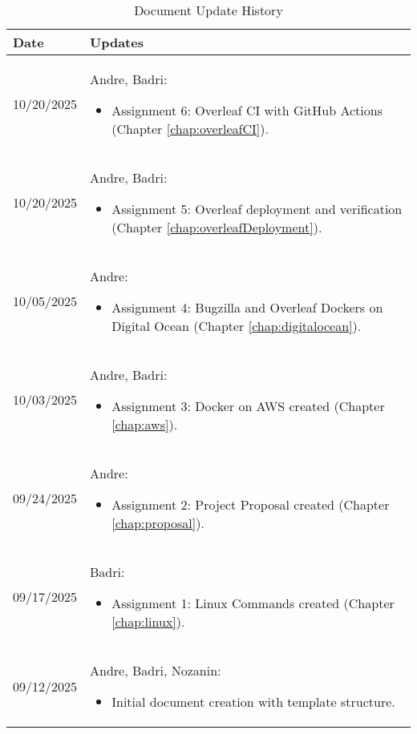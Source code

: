 \begin{longtable}{|l||p{13.5cm}|}
\caption{Document Update History \label{Table::UpdateHistory}}\\
\hline
\textbf{Date} & \textbf{Updates} \\
\hline 
\endhead
10/20/2025 & Andre, Badri:
\begin{itemize}[topsep=0pt,itemsep=0pt,parsep=0pt,partopsep=0pt,leftmargin=12pt]
\item Assignment 6: Overleaf CI with GitHub Actions (Chapter \ref{chap:overleafCI}).
\end{itemize}
\\ \hline
10/20/2025 & Andre, Badri:
\begin{itemize}[topsep=0pt,itemsep=0pt,parsep=0pt,partopsep=0pt,leftmargin=12pt]
\item Assignment 5: Overleaf deployment and verification (Chapter \ref{chap:overleafDeployment}).
\end{itemize}
\\ \hline
10/05/2025 & Andre:
\begin{itemize}[topsep=0pt,itemsep=0pt,parsep=0pt,partopsep=0pt,leftmargin=12pt]
\item Assignment 4: Bugzilla and Overleaf Dockers on Digital Ocean (Chapter \ref{chap:digitalocean}).
\end{itemize} 
\\ \hline
10/03/2025 & Andre, Badri:
\begin{itemize}[topsep=0pt,itemsep=0pt,parsep=0pt,partopsep=0pt,leftmargin=12pt]
\item Assignment 3: Docker on AWS created (Chapter \ref{chap:aws}).
\end{itemize} 
\\ \hline
09/24/2025 & Andre:
\begin{itemize}[topsep=0pt,itemsep=0pt,parsep=0pt,partopsep=0pt,leftmargin=12pt]
\item Assignment 2: Project Proposal created (Chapter \ref{chap:proposal}).
\end{itemize} 
\\ \hline
09/17/2025 & Badri:
\begin{itemize}[topsep=0pt,itemsep=0pt,parsep=0pt,partopsep=0pt,leftmargin=12pt]
\item Assignment 1: Linux Commands created (Chapter \ref{chap:linux}).
\end{itemize} 
\\ \hline
09/12/2025 & Andre, Badri, Nozanin:
\begin{itemize}[topsep=0pt,itemsep=0pt,parsep=0pt,partopsep=0pt,leftmargin=12pt]
\item Initial document creation with template structure.
\end{itemize}
\\ \hline
\end{longtable}